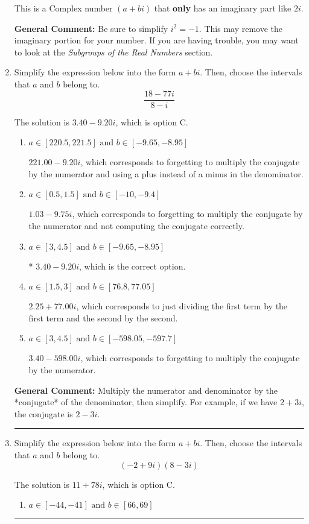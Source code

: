 \documentclass{extbook}[14pt]
\newcommand{\litem}[1]{\item #1

\rule{\textwidth}{0.4pt}}
\begin{document}
\begin{enumerate}
{\begin{enumerate}[label=\Alph*.]
This is a Complex number $(a+bi)$ that \textbf{only} has an imaginary part like $2i$.
\end{enumerate}

\textbf{General Comment:} Be sure to simplify $i^2 = -1$. This may remove the imaginary portion for your number. If you are having trouble, you may want to look at the \textit{Subgroups of the Real Numbers} section.
}
\litem{
Simplify the expression below into the form $a+bi$. Then, choose the intervals that $a$ and $b$ belong to.
\[ \frac{18 - 77 i}{8 - i} \]

The solution is \( 3.40  - 9.20 i \), which is option C.\begin{enumerate}[label=\Alph*.]
\item \( a \in [220.5, 221.5] \text{ and } b \in [-9.65, -8.95] \)

 $221.00  - 9.20 i$, which corresponds to forgetting to multiply the conjugate by the numerator and using a plus instead of a minus in the denominator.
\item \( a \in [0.5, 1.5] \text{ and } b \in [-10, -9.4] \)

 $1.03  - 9.75 i$, which corresponds to forgetting to multiply the conjugate by the numerator and not computing the conjugate correctly.
\item \( a \in [3, 4.5] \text{ and } b \in [-9.65, -8.95] \)

* $3.40  - 9.20 i$, which is the correct option.
\item \( a \in [1.5, 3] \text{ and } b \in [76.8, 77.05] \)

 $2.25  + 77.00 i$, which corresponds to just dividing the first term by the first term and the second by the second.
\item \( a \in [3, 4.5] \text{ and } b \in [-598.05, -597.7] \)

 $3.40  - 598.00 i$, which corresponds to forgetting to multiply the conjugate by the numerator.
\end{enumerate}

\textbf{General Comment:} Multiply the numerator and denominator by the *conjugate* of the denominator, then simplify. For example, if we have $2+3i$, the conjugate is $2-3i$.
}
\litem{
Simplify the expression below into the form $a+bi$. Then, choose the intervals that $a$ and $b$ belong to.
\[ (-2 + 9 i)(8 - 3 i) \]

The solution is \( 11 + 78 i \), which is option C.\begin{enumerate}[label=\Alph*.]
\item \( a \in [-44, -41] \text{ and } b \in [66, 69] \)


\end{enumerate}}
\end{enumerate}
\end{document}
